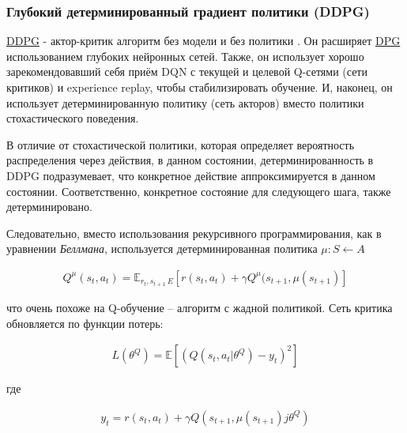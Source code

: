 \subsubsection{Глубокий детерминированный градиент политики (DDPG)}

\hyperref[acr:ddpg]{DDPG} - актор-критик алгоритм без модели и без политики \cite{lillicrap2015continuous}. Он расширяет \hyperref[acr:dpg]{DPG} использованием глубоких нейронных сетей. Также, он использует хорошо зарекомендовавший себя приём DQN с текущей и целевой Q-сетями (сети критиков) и experience replay, чтобы стабилизировать обучение. И, наконец, он использует детерминированную политику (сеть акторов) вместо политики стохастического поведения.

В отличие от стохастической политики, которая определяет вероятность распределения через действия, в данном состоянии, детерминированность в DDPG подразумевает, что конкретное действие аппроксимируется в данном состоянии. Соответственно, конкретное состояние для следующего шага, также детерминировано.

Следовательно, вместо использования рекурсивного программирования, как в уравнении {\itshape Беллмана}, используется детерминированная политика $\mu : S \leftarrow A$ \cite{lillicrap2015continuous}

\begin{equation}
	\label{eq:ch1-ddpg-1}
	\begin{multlined}
		Q^\mu (s_t, a_t) = \mathbb{E}_{r_t, s_{t+1}~E}[r(s_t, a_t) + \gamma Q^\mu(s_{t+1}, \mu(s_{t+1})]
	\end{multlined}
\end{equation}

что очень похоже на Q-обучение – алгоритм с жадной политикой. Сеть критика обновляется по функции потерь:

\begin{equation}
	\label{eq:ch1-ddpg-1}
	\begin{multlined}
		L(\theta^Q) = \mathbb{E}[(Q(s_t, a_t|\theta^Q) - y_t)^2]
	\end{multlined}
\end{equation}

где

\begin{equation}
	\label{eq:ch1-ddpg-3}
	\begin{multlined}
		y_t = r(s_t, a_t) + \gamma Q(s_{t+1}, \mu(s_{t+1})j\theta^Q)
	\end{multlined}
\end{equation}

